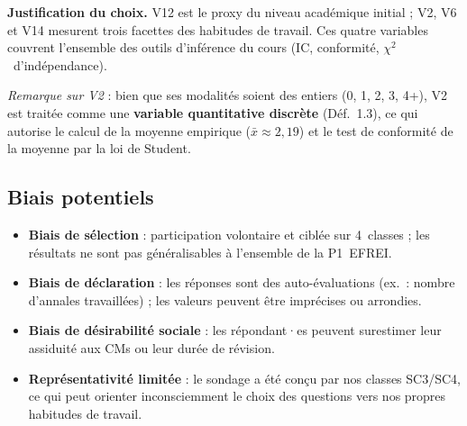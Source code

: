 \textbf{Justification du choix.} V12 est le proxy du niveau académique initial ; V2, V6 et V14 mesurent trois facettes des habitudes de travail. Ces quatre variables couvrent l'ensemble des outils d'inférence du cours (IC, conformité, $\chi^2$~d'indépendance).

\textit{Remarque sur V2} : bien que ses modalités soient des entiers (0, 1, 2, 3, 4+), V2 est traitée comme une \textbf{variable quantitative discrète} (Déf.~1.3), ce qui autorise le calcul de la moyenne empirique ($\bar{x} \approx 2{,}19$) et le test de conformité de la moyenne par la loi de Student.

\subsection{Biais potentiels}

\begin{itemize}
  \item \textbf{Biais de sélection} : participation volontaire et ciblée sur 4~classes ; les résultats ne sont pas généralisables à l'ensemble de la P1~EFREI.
  \item \textbf{Biais de déclaration} : les réponses sont des auto-évaluations (ex.\ : nombre d'annales travaillées) ; les valeurs peuvent être imprécises ou arrondies.
  \item \textbf{Biais de désirabilité sociale} : les répondant·es peuvent surestimer leur assiduité aux CMs ou leur durée de révision.
  \item \textbf{Représentativité limitée} : le sondage a été conçu par nos classes SC3/SC4, ce qui peut orienter inconsciemment le choix des questions vers nos propres habitudes de travail.
\end{itemize}
